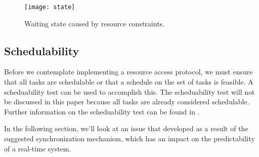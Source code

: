 \begin{figure}[ht]
    \centering
    \texttt{[image: state]}
    \caption{Waiting state caused by resource constraints. \cite{b5}}
    \label{fig:state}
\end{figure}



\subsection{Schedulability}

Before we contemplate implementing a resource access protocol, we must ensure that all tasks are schedulable or that a schedule on the set of tasks is feasible. A scheduability test can be used to accomplish this. The scheduability test will not be discussed in this paper because all tasks are already considered schedulable. Further information on the scheduability test can be found in \cite{b5}.

In the following section, we'll look at an issue that developed as a result of the suggested synchronization mechanism, which has an impact on the predictability of a real-time system.